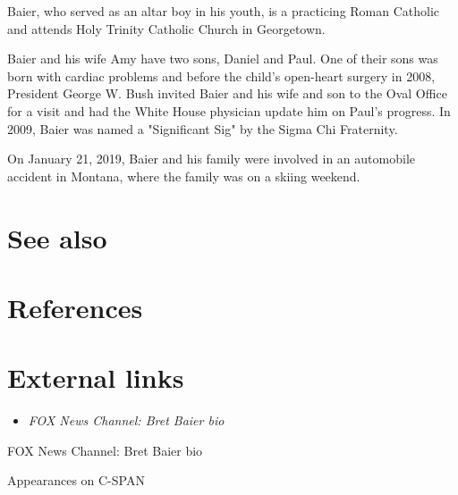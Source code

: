 Baier, who served as an altar boy in his youth, is a practicing Roman
Catholic and attends Holy Trinity Catholic Church in Georgetown.

Baier and his wife Amy have two sons, Daniel and Paul. One of their sons
was born with cardiac problems and before the child's open-heart surgery
in 2008, President George W. Bush invited Baier and his wife and son to
the Oval Office for a visit and had the White House physician update him
on Paul's progress. In 2009, Baier was named a "Significant Sig" by the
Sigma Chi Fraternity.

On January 21, 2019, Baier and his family were involved in an automobile
accident in Montana, where the family was on a skiing weekend.

\section{See also}\label{see-also}

\section{References}\label{references}

\section{External links}\label{external-links}

\begin{itemize}
\item
  \emph{FOX News Channel: Bret Baier bio}
\end{itemize}

FOX News Channel: Bret Baier bio

Appearances on C-SPAN
